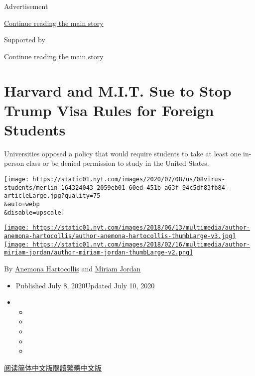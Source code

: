 Advertisement

\protect\hyperlink{after-top}{Continue reading the main story}

Supported by

\protect\hyperlink{after-sponsor}{Continue reading the main story}

\hypertarget{harvard-and-mit-sue-to-stop-trump-visa-rules-for-foreign-students}{%
\section{Harvard and M.I.T. Sue to Stop Trump Visa Rules for Foreign
Students}\label{harvard-and-mit-sue-to-stop-trump-visa-rules-for-foreign-students}}

Universities opposed a policy that would require students to take at
least one in-person class or be denied permission to study in the United
States.

\texttt{[image: https://static01.nyt.com/images/2020/07/08/us/08virus-students/merlin\_164324043\_2059eb01-60ed-451b-a63f-94c5df83fb84-articleLarge.jpg?quality=75\\\&auto=webp\\\&disable=upscale]}

\href{https://www.nytimes.com/by/anemona-hartocollis}{\texttt{[image: https://static01.nyt.com/images/2018/06/13/multimedia/author-anemona-hartocollis/author-anemona-hartocollis-thumbLarge-v3.jpg]}}\href{https://www.nytimes.com/by/miriam-jordan/}{\texttt{[image: https://static01.nyt.com/images/2018/02/16/multimedia/author-miriam-jordan/author-miriam-jordan-thumbLarge-v2.png]}}

By \href{https://www.nytimes.com/by/anemona-hartocollis}{Anemona
Hartocollis} and \href{https://www.nytimes.com/by/miriam-jordan/}{Miriam
Jordan}

\begin{itemize}
\item
  Published July 8, 2020Updated July 10, 2020
\item
  \begin{itemize}
  \item
  \item
  \item
  \item
  \item
  \end{itemize}
\end{itemize}

\href{https://cn.nytimes.com/usa/20200709/harvard-mit-trump-ice-students/}{阅读简体中文版}\href{https://cn.nytimes.com/usa/20200709/harvard-mit-trump-ice-students/zh-hant/}{閱讀繁體中文版}

